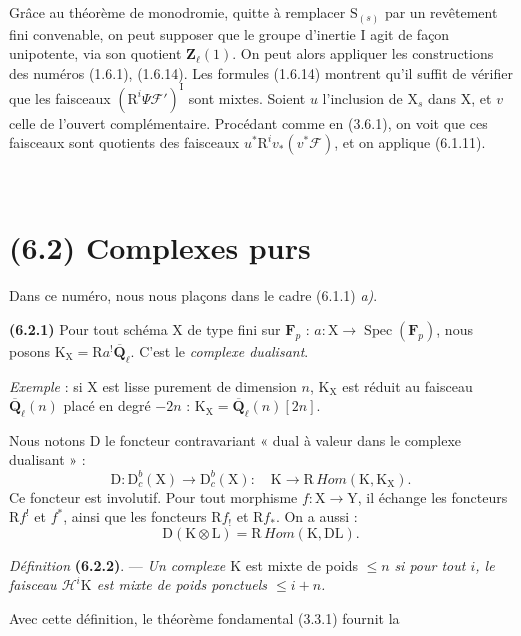 \documentclass[11pt,leqno]{article}
\newcommand{\Page}[1]{\ifvmode\noindent\else\unskip\ \fi{\footnotesize\textcolor{gray}{[p.\,#1]}}\ \ignorespaces}
\begin{document}
Grâce au théorème de monodromie, quitte à remplacer
\(\mathrm{S}_{(s)}\) par un revêtement fini convenable, on peut
supposer que le groupe d’inertie \(\mathrm{I}\) agit de façon
unipotente, via son quotient \(\mathbf{Z}_\ell(1)\). On peut alors
appliquer les constructions des numéros (1.6.1), (1.6.14).
Les formules (1.6.14) montrent qu’il suffit de vérifier que les
faisceaux \((\mathrm{R}^i\Psi\mathscr{F}')^{\mathrm{I}}\) sont
mixtes. Soient \(u\) l’inclusion de \(\mathrm{X}_s\) dans
\(\mathrm{X}\), et \(v\) celle de l’ouvert complémentaire.
Procédant comme en (3.6.1), on voit que ces faisceaux sont quotients
des faisceaux \(u^*\mathrm{R}^iv_*(v^*\mathscr{F})\), et on applique
(6.1.11).

\Page{247}
\section*{(6.2) Complexes purs}

Dans ce numéro, nous nous plaçons dans le cadre (6.1.1) \textit{a)}.

\textbf{(6.2.1)} Pour tout schéma \(\mathrm{X}\) de type fini sur
\(\mathbf{F}_p\) : \(a:\mathrm{X}\to\operatorname{Spec}(\mathbf{F}_p)\),
nous posons \(\mathrm{K}_{\mathrm{X}}=\mathrm{R}a^!\overline{\mathbf{Q}}_\ell\).
C’est le \textit{complexe dualisant}.

\textit{Exemple} : si \(\mathrm{X}\) est lisse purement de dimension
\(n\), \(\mathrm{K}_{\mathrm{X}}\) est réduit au faisceau
\(\overline{\mathbf{Q}}_\ell(n)\) placé en degré \(-2n\) :
\(\mathrm{K}_{\mathrm{X}}=\overline{\mathbf{Q}}_\ell(n)[2n]\).

Nous notons \(\mathrm{D}\) le foncteur contravariant « dual à valeur
dans le complexe dualisant » :
\[
\mathrm{D}:\mathrm{D}_c^b(\mathrm{X})\to\mathrm{D}_c^b(\mathrm{X}):
\quad \mathrm{K}\to\mathrm{R}\,\mathit{Hom}(\mathrm{K},\mathrm{K}_{\mathrm{X}}).
\]
Ce foncteur est involutif. Pour tout morphisme
\(f:\mathrm{X}\to\mathrm{Y}\), il échange les foncteurs
\(\mathrm{R}f^!\) et \(f^*\), ainsi que les foncteurs
\(\mathrm{R}f_!\) et \(\mathrm{R}f_*\). On a aussi :
\[
\mathrm{D}(\mathrm{K}\otimes\mathrm{L})
=\mathrm{R}\,\mathit{Hom}(\mathrm{K},\mathrm{D}\mathrm{L}).
\]

\textit{Définition} \textbf{(6.2.2)}. — \textit{Un complexe
\(\mathrm{K}\)} est mixte de poids \(\leq n\) \textit{si pour tout
\(i\), le faisceau \(\mathscr{H}^i\mathrm{K}\) est mixte de poids
ponctuels \(\leq i+n\).}

Avec cette définition, le théorème fondamental (3.3.1) fournit la
\end{document}
